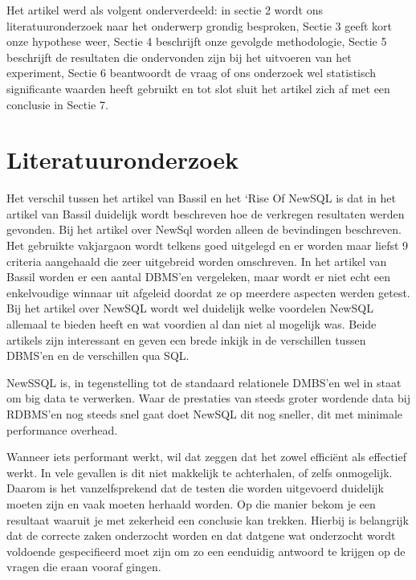 \documentclass[fleqn,10pt]{artikeltin}
\begin{document}
\vspace{5mm} %

Het artikel werd als volgent onderverdeeld: in sectie 2 wordt ons literatuuronderzoek naar het onderwerp grondig besproken, Sectie 3 geeft kort onze hypothese weer, Sectie 4 beschrijft onze  gevolgde methodologie, Sectie 5 beschrijft de resultaten die ondervonden zijn bij het uitvoeren van het experiment, Sectie 6 beantwoordt de vraag of ons onderzoek wel statistisch significante waarden heeft gebruikt en tot slot sluit het artikel zich af met een conclusie in Sectie 7.

\section{Literatuuronderzoek}
\label{sec:Literatuuronderzoek}

 

Het verschil tussen het artikel van Bassil en het ‘Rise Of NewSQL is dat in het artikel van Bassil duidelijk wordt beschreven hoe de verkregen resultaten werden gevonden. Bij het artikel over NewSql worden alleen de bevindingen beschreven. Het gebruikte vakjargaon wordt telkens goed uitgelegd en er worden maar liefst 9 criteria aangehaald die zeer uitgebreid worden omschreven. In het artikel van Bassil worden er een aantal DBMS’en vergeleken, maar wordt er niet echt een enkelvoudige winnaar uit afgeleid doordat ze op meerdere aspecten werden getest. Bij het artikel over NewSQL wordt wel duidelijk welke voordelen NewSQL allemaal te bieden heeft en wat voordien al dan niet al mogelijk was. Beide artikels zijn interessant en geven een brede inkijk in de verschillen tussen DBMS’en en de verschillen qua SQL. 

NewSSQL is, in tegenstelling tot de standaard relationele DMBS’en wel in staat om big data te verwerken. Waar de prestaties van steeds groter wordende data bij RDBMS’en nog steeds snel gaat doet NewSQL dit nog sneller, dit met minimale performance overhead.

Wanneer iets performant werkt, wil dat zeggen dat het zowel efficiënt als effectief werkt. In vele gevallen is dit niet makkelijk te achterhalen, of zelfs onmogelijk. Daarom is het vanzelfsprekend dat de testen die worden uitgevoerd duidelijk moeten zijn en vaak moeten herhaald worden. Op die manier bekom je een resultaat waaruit je met zekerheid een conclusie kan trekken.  Hierbij is belangrijk dat de correcte zaken onderzocht worden en dat datgene wat onderzocht wordt voldoende gespecifieerd moet zijn om zo een eenduidig antwoord te krijgen op de vragen die eraan vooraf gingen.
\end{document}
